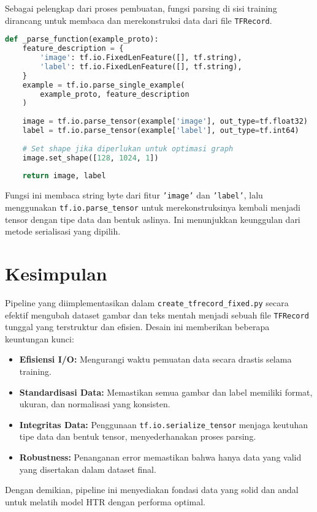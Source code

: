 \documentclass{article}
\begin{document}
Sebagai pelengkap dari proses pembuatan, fungsi parsing di sisi training dirancang untuk membaca dan merekonstruksi data dari file \texttt{TFRecord}.

\begin{lstlisting}[language=Python, caption={Contoh fungsi parsing untuk membaca TFRecord.}, label=lst:parse]
def _parse_function(example_proto):
    feature_description = {
        'image': tf.io.FixedLenFeature([], tf.string),
        'label': tf.io.FixedLenFeature([], tf.string),
    }
    example = tf.io.parse_single_example(
        example_proto, feature_description
    )
    
    image = tf.io.parse_tensor(example['image'], out_type=tf.float32)
    label = tf.io.parse_tensor(example['label'], out_type=tf.int64)
    
    # Set shape jika diperlukan untuk optimasi graph
    image.set_shape([128, 1024, 1])
    
    return image, label
\end{lstlisting}

Fungsi ini membaca string byte dari fitur \texttt{'image'} dan \texttt{'label'}, lalu menggunakan \texttt{tf.io.parse\_tensor} untuk merekonstruksinya kembali menjadi tensor dengan tipe data dan bentuk aslinya. Ini menunjukkan keunggulan dari metode serialisasi yang dipilih.

\section{Kesimpulan}

Pipeline yang diimplementasikan dalam \texttt{create\_tfrecord\_fixed.py} secara efektif mengubah dataset gambar dan teks mentah menjadi sebuah file \texttt{TFRecord} tunggal yang terstruktur dan efisien. Desain ini memberikan beberapa keuntungan kunci:
\begin{itemize}
    \item \textbf{Efisiensi I/O:} Mengurangi waktu pemuatan data secara drastis selama training.
    \item \textbf{Standardisasi Data:} Memastikan semua gambar dan label memiliki format, ukuran, dan normalisasi yang konsisten.
    \item \textbf{Integritas Data:} Penggunaan \texttt{tf.io.serialize\_tensor} menjaga keutuhan tipe data dan bentuk tensor, menyederhanakan proses parsing.
    \item \textbf{Robustness:} Penanganan error memastikan bahwa hanya data yang valid yang disertakan dalam dataset final.
\end{itemize}

Dengan demikian, pipeline ini menyediakan fondasi data yang solid dan andal untuk melatih model HTR dengan performa optimal.
\end{document}
